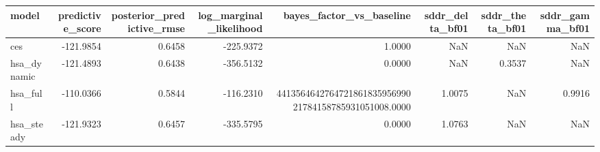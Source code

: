 \begin{tabular}{lrrrrrrr}
\toprule
model & predictive\_score & posterior\_predictive\_rmse & log\_marginal\_likelihood & bayes\_factor\_vs\_baseline & sddr\_delta\_bf01 & sddr\_theta\_bf01 & sddr\_gamma\_bf01 \\
\midrule
ces & -121.9854 & 0.6458 & -225.9372 & 1.0000 & NaN & NaN & NaN \\
hsa\_dynamic & -121.4893 & 0.6438 & -356.5132 & 0.0000 & NaN & 0.3537 & NaN \\
hsa\_full & -110.0366 & 0.5844 & -116.2310 & 441356464276472186183595699021784158785931051008.0000 & 1.0075 & NaN & 0.9916 \\
hsa\_steady & -121.9323 & 0.6457 & -335.5795 & 0.0000 & 1.0763 & NaN & NaN \\
\bottomrule
\end{tabular}
